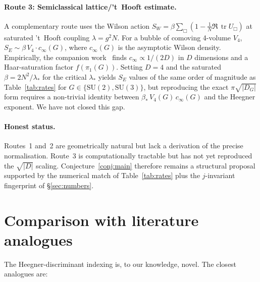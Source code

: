 \documentclass[11pt,a4paper]{article}
\theoremstyle{plain}
\theoremstyle{definition}
\newcommand{\SU}{\mathrm{SU}}
\newcommand{\tr}{\operatorname{tr}}
\begin{document}
\paragraph{Route 3: Semiclassical lattice/'t~Hooft estimate.}
A complementary route uses the Wilson action $S_W=\beta\sum_{\Box}(1-\tfrac{1}{N}\Re\,\tr U_\Box)$ at saturated 't~Hooft coupling $\lambda=g^2N$. For a bubble of comoving 4-volume $V_4$, $S_E\sim\beta\,V_4\cdot c_\infty(G)$, where $c_\infty(G)$ is the asymptotic Wilson density. Empirically, the companion work~\cite{Companion2} finds $c_\infty\propto 1/(2D)$ in $D$ dimensions and a Haar-saturation factor $f(\pi_1(G))$. Setting $D=4$ and the saturated $\beta=2N^2/\lambda_*$ for the critical $\lambda_*$ yields $S_E$ values of the same order of magnitude as Table~\ref{tab:rates} for $G\in\{\SU(2),\SU(3)\}$, but reproducing the exact $\pi\sqrt{|D_G|}$ form requires a non-trivial identity between $\beta_*\,V_4(G)\,c_\infty(G)$ and the Heegner exponent. We have not closed this gap.

\paragraph{Honest status.}
Routes~1 and~2 are geometrically natural but lack a derivation of the precise normalisation. Route~3 is computationally tractable but has not yet reproduced the $\sqrt{|D|}$ scaling. Conjecture~\ref{conj:main} therefore remains a structural proposal supported by the numerical match of Table~\ref{tab:rates} plus the $j$-invariant fingerprint of \S\ref{sec:numbers}.

\section{Comparison with literature analogues}\label{sec:litcompare}

The Heegner-discriminant indexing is, to our knowledge, novel. The closest analogues are:
\end{document}

